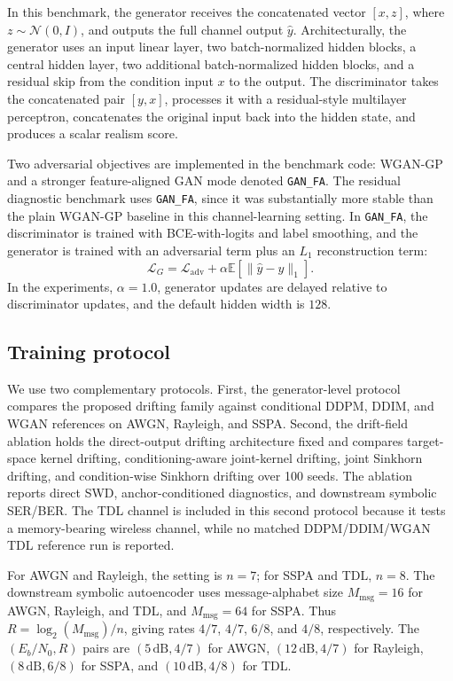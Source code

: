 In this benchmark, the generator receives the concatenated vector \([x, z]\), where \(z \sim \mathcal{N}(0, I)\), and outputs the full channel output \(\hat{y}\).
Architecturally, the generator uses an input linear layer, two batch-normalized hidden blocks, a central hidden layer, two additional batch-normalized hidden blocks, and a residual skip from the condition input \(x\) to the output.
The discriminator takes the concatenated pair \([y, x]\), processes it with a residual-style multilayer perceptron, concatenates the original input back into the hidden state, and produces a scalar realism score.

Two adversarial objectives are implemented in the benchmark code: WGAN-GP and a stronger feature-aligned GAN mode denoted \texttt{GAN\_FA}.
The residual diagnostic benchmark uses \texttt{GAN\_FA}, since it was substantially more stable than the plain WGAN-GP baseline in this channel-learning setting.
In \texttt{GAN\_FA}, the discriminator is trained with BCE-with-logits and label smoothing, and the generator is trained with an adversarial term plus an \(L_1\) reconstruction term:
\begin{equation}
\mathcal{L}_{G}
=
\mathcal{L}_{\text{adv}}
+
\alpha
\mathbb{E}\left[\|\hat{y} - y\|_1\right].
\end{equation}
In the experiments, \(\alpha = 1.0\), generator updates are delayed relative to discriminator updates, and the default hidden width is \(128\).



\subsection{Training protocol}
We use two complementary protocols.
First, the generator-level protocol compares the proposed drifting family against conditional DDPM, DDIM, and WGAN references on AWGN, Rayleigh, and SSPA.
Second, the drift-field ablation holds the direct-output drifting architecture fixed and compares target-space kernel drifting, conditioning-aware joint-kernel drifting, joint Sinkhorn drifting, and condition-wise Sinkhorn drifting over 100 seeds.
The ablation reports direct SWD, anchor-conditioned diagnostics, and downstream symbolic SER/BER.
The TDL channel is included in this second protocol because it tests a memory-bearing wireless channel, while no matched DDPM/DDIM/WGAN TDL reference run is reported.

For AWGN and Rayleigh, the setting is \(n=7\); for SSPA and TDL, \(n=8\).
The downstream symbolic autoencoder uses message-alphabet size \(M_{\mathrm{msg}}=16\) for AWGN, Rayleigh, and TDL, and \(M_{\mathrm{msg}}=64\) for SSPA.
Thus \(R=\log_2(M_{\mathrm{msg}})/n\), giving rates \(4/7\), \(4/7\), \(6/8\), and \(4/8\), respectively.
The \((E_b/N_0,R)\) pairs are \((5\,\mathrm{dB},4/7)\) for AWGN, \((12\,\mathrm{dB},4/7)\) for Rayleigh, \((8\,\mathrm{dB},6/8)\) for SSPA, and \((10\,\mathrm{dB},4/8)\) for TDL.

